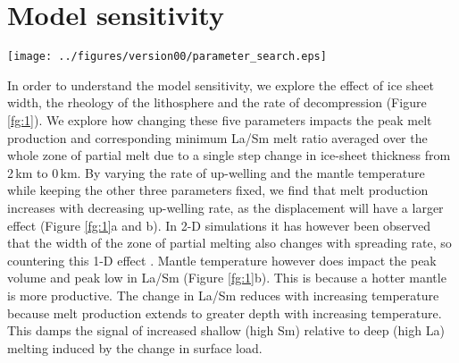 \documentclass[a4paper,11pt,onecolumn]{article}
\begin{document}
\section{Model sensitivity}

\begin{figure*}[ht]
  \centering
  \texttt{[image: ../figures/version00/parameter\_search.eps]}
  \caption{Plots of \% change in melting from steady-state to peak, and the drop in La/Sm, for a step reduction in ice-sheet thickness from 2 to 0\,km, as a function of the model parameters; mantle potential temperature, up-welling rate, lithosphere viscosity, elastic thickness, and the width of the ice-sheet. In (a) and (b) the lithosphere viscosity is set to $10^{21.5}\rm\,Pa\,s$, the elastic thickness is 30\,km and the ice-sheet width is 100\,km. In parts (c) and (d) the up-welling rate is $30\rm\,mm\,yr^{-1}$, the mantle potential temperature is $1400\rm\,^{\circ}C$, and the ice-sheet width is 100\,km. In parts (e) and (f) the the up-welling rate is $30\rm\,mm\,yr^{-1}$, the mantle potential temperature is $1400\rm\,^{\circ}C$, and the lithosphere viscosity is $10^{21.5}\rm\,Pa\,s$.}
  \label{fg:1}
\end{figure*}

In order to understand the model sensitivity, we explore the effect of ice sheet width, the rheology of the lithosphere and the rate of decompression (Figure \ref{fg:1}). We explore how changing these five parameters impacts the peak melt production and corresponding minimum La/Sm melt ratio averaged over the whole zone of partial melt due to a single step change in ice-sheet thickness from 2\,km to 0\,km. By varying the rate of up-welling and the mantle temperature while keeping the other three parameters fixed, we find that melt production increases with decreasing up-welling rate, as the displacement will have a larger effect (Figure \ref{fg:1}a and b). In 2-D simulations it has however been observed that the width of the zone of partial melting also changes with spreading rate, so countering this 1-D effect \cite{crowley-etal-2015}. Mantle temperature however does impact the peak volume and peak low in La/Sm (Figure \ref{fg:1}b). This is because a hotter mantle is more productive. The change in La/Sm reduces with increasing temperature because melt production extends to greater depth with increasing temperature. This damps the signal of increased shallow (high Sm) relative to deep (high La) melting induced by the change in surface load.
\end{document}
